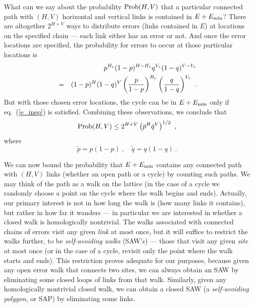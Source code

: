 What can we say about the probability ${\rm Prob}(H,V)$ that a particular connected path with $(H,V)$ horizontal and vertical links is contained in $E+E_{\rm min}$?
There are altogether $2^{H+V}$ ways to distribute errors (links contained in $E$) at locations on the
specified chain --- each link either has an error or not. And once the error
locations are specified, the probability for errors to occur at those particular
locations is
\begin{eqnarray}
&&p^{H_e}(1-p)^{H-H_e}q^{V_e}(1-q)^{V-V_e}\nonumber\\
&=& (1-p)^H (1-q)^V \left({p\over 1-p}\right)^{H_e}\left({q\over 1-q}\right)^{V_e}~.
\end{eqnarray}
But with those chosen error locations, the cycle can be in $E+E_{\rm min}$ only
if eq.~(\ref{e_ineq}) is satisfied.  Combining these observations, we conclude
that
\begin{equation}
{\rm Prob}(H,V)\le 2^{H+V}\left(\tilde p^{H}\tilde q^{V}\right)^{1/2}~,
\end{equation}
where
\begin{equation}
\tilde p = p(1-p)~,\quad \tilde q=q(1-q)~.
\end{equation}

We can now bound the probability that $E+E_{\rm min}$ contains
any connected path  with $(H,V)$ links (whether an open path or a cycle) by counting such paths. We may think of the path as a walk on the lattice (in the case of a cycle we randomly choose a point on the cycle where the walk begins and ends). Actually, our primary
interest is not in how long the walk is (how many links it contains), but
rather in how far it wanders --- in particular we are interested in whether a closed walk is homologically nontrivial. The walks associated with connected chains of errors visit any given
{\em link} at most once, but it will suffice to restrict the walks further, to
be {\em self-avoiding walks} (SAW's) --- those that visit any given {\em site}
at most once (or in the case of a cycle, revisit only the point where the walk starts and ends).  This restriction proves adequate for our purposes, because given
any open error walk that connects two sites, we can always obtain an SAW by
eliminating some closed loops of links from that walk.  Similarly, given any
homologically nontrivial closed walk, we can obtain a closed SAW (a {\em self-avoiding polygon}, or SAP) by eliminating some links.

